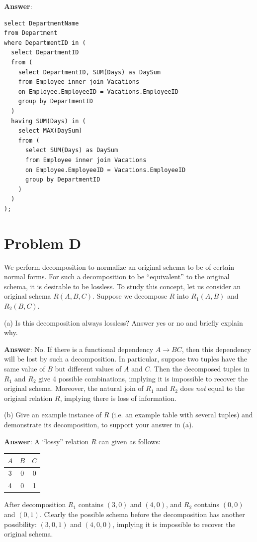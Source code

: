 \documentclass{article}
\begin{document}
{\bf Answer}:
\begin{verbatim}
select DepartmentName
from Department
where DepartmentID in (
  select DepartmentID
  from (
    select DepartmentID, SUM(Days) as DaySum
    from Employee inner join Vacations
    on Employee.EmployeeID = Vacations.EmployeeID
    group by DepartmentID
  )
  having SUM(Days) in (
    select MAX(DaySum)
    from (
      select SUM(Days) as DaySum
      from Employee inner join Vacations
      on Employee.EmployeeID = Vacations.EmployeeID
      group by DepartmentID
    )
  )
);
\end{verbatim}

\section{Problem D}
We perform decomposition to normalize an original schema to be of certain normal forms. For such a decomposition to be ``equivalent'' to the original schema, it is desirable to be lossless. To study this concept, let us consider an original schema $R(A, B, C)$. Suppose we decompose $R$ into $R_1 (A, B)$ and $R_2 (B, C)$.

(a) Is this decomposition always lossless? Answer yes or no and briefly explain why.

{\bf Answer}: No. If there is a functional dependency $A \to BC$, then this dependency will be lost by such a decomposition. In particular, suppose two tuples have the same value of $B$ but different values of $A$ and $C$. Then the decomposed tuples in $R_1$ and $R_2$ give 4 possible combinations, implying it is impossible to recover the original schema. Moreover, the natural join of $R_1$ and $R_2$ does \emph{not} equal to the origianl relation $R$, implying there is loss of information.

(b) Give an example instance of $R$ (i.e. an example table with several tuples) and demonstrate its decomposition, to support your answer in (a).

{\bf Answer}: A ``lossy'' relation $R$ can given as follows:

\begin{tabular}{c c c}
$A$ & $B$ & $C$ \\
\hline
3 & 0 & 0 \\
4 & 0 & 1 \\
\end{tabular}

After decomposition $R_1$ contains $(3, 0)$ and $(4, 0)$, and $R_2$ contains $(0, 0)$ and $(0, 1)$.
Clearly the possible schema before the decomposition has another possibility: $(3, 0, 1)$ and $(4, 0, 0)$, implying it is impossible to recover the original schema.
\end{document}
